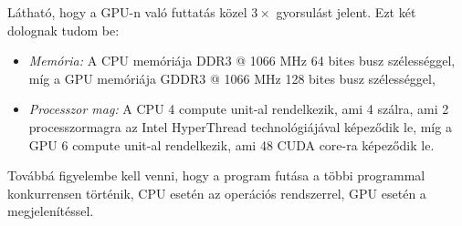 	\noindent Látható, hogy a GPU-n való futtatás közel $3\times$ gyorsulást jelent.
	Ezt két dolognak tudom be:
	\begin{itemize}
		\item \emph{Memória:} A CPU memóriája DDR3 @ 1066 MHz 64 bites busz szélességgel, míg a GPU
		memóriája GDDR3 @ 1066 MHz 128 bites busz szélességgel,
		\item \emph{Processzor mag:} A CPU 4 compute unit-al rendelkezik, ami 4 szálra, ami 2
		processzormagra az Intel HyperThread technológiájával képeződik le, míg a GPU 6 compute unit-al
		rendelkezik, ami 48 CUDA core-ra képeződik le.
	\end{itemize}
	Továbbá figyelembe kell venni, hogy a program futása a többi programmal konkurrensen történik, CPU
	esetén az operációs rendszerrel, GPU esetén a megjelenítéssel.
	


